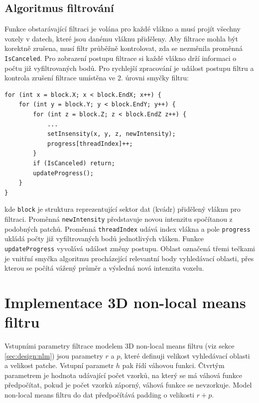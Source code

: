 \subsection*{Algoritmus filtrování}
Funkce obstarávající filtraci je volána pro každé vlákno a musí projít všechny voxely v datech, které jsou danému vláknu přiděleny. Aby filtrace mohla být korektně zrušena, musí filtr průběžně kontrolovat, zda se nezměnila proměnná \texttt{IsCanceled}. Pro zobrazení postupu filtrace si každé vlákno drží informaci o počtu již vyfiltrovaných bodů. Pro rychlejší zpracování je událost postupu filtru a kontrola zrušení filtrace umístěna ve 2. úrovni smyčky filtru:
\begin{verbatim}
for (int x = block.X; x < block.EndX; x++) {
    for (int y = block.Y; y < block.EndY; y++) {
        for (int z = block.Z; z < block.EndZ z++) {
            ...
            setInsensity(x, y, z, newIntensity);
            progress[threadIndex]++;
        }
        if (IsCanceled) return;
        updateProgress();
    }
}
\end{verbatim}
kde \texttt{block} je struktura reprezentující sektor dat (kvádr) přidělený vláknu pro filtraci. Proměnná \texttt{newIntensity} představuje novou intenzitu spočítanou z podobných patchů. Proměnná \texttt{threadIndex} udává index vlákna a pole \texttt{progress} ukládá počty již vyfiltrovaných bodů jednotlivých vláken. Funkce \texttt{updateProgress} vyvolává událost změny postupu. Oblast označená třemi tečkami je vnitřní smyčka algoritmu procházející relevantní body vyhledávací oblasti, přes kterou se počítá vážený průměr a výsledná nová intenzita voxelu.

\section{Implementace 3D non-local means filtru}
\label{sec:impl:nlm}
Vstupními parametry filtrace modelem 3D non-local means filtru (viz sekce \ref{sec:design:nlm}) jsou parametry $r$ a $p$, které definuji velikost vyhledávací oblasti a velikost patche. Vstupní parametr $h$ pak řídí váhovou funkci. Čtvrtým parametrem je hodnota udávající počet vzorků, na který se má váhová funkce předpočítat, pokud je počet vzorků záporný, váhová funkce se nevzorkuje. Model non-local means filtru do dat předpočítává padding o velikosti $r + p$.

